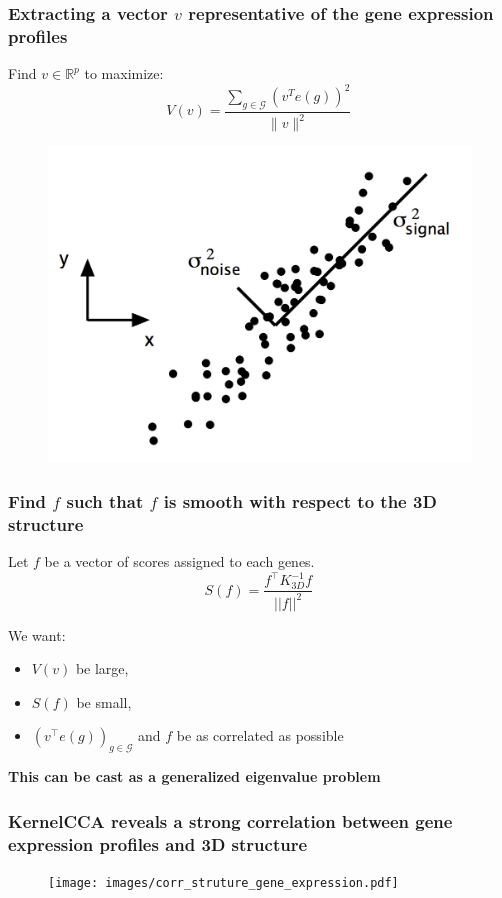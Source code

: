 \documentclass[11pt,xcolor=dvipsnames]{beamer}
\begin{document}
  \begin{frame}
  \frametitle{Extracting a vector $v$ representative of the gene expression
  profiles}
  Find $v \in \mathbb{R}^p$ to maximize:
  \begin{equation*}\label{eq:variance}
  V(v) = \frac{\sum_{g \in \mathcal{G}} \left(v^T e(g)\right)^2}{\|v\|^2}\,
  \end{equation*}

  \begin{figure}
  \includegraphics[width=0.5\linewidth]{figures/pca.png}
  \end{figure}
  \end{frame}

\begin{frame}
\frametitle{Find $f$ such that $f$ is smooth with respect to the 3D structure}
  Let $f$ be a vector of scores assigned to each genes. \\

\begin{equation*}\label{eq:smoothness}
  S(f) = \frac{f^\top K^{-1}_{3D} f}{||f||^2}\,
  \end{equation*}

  \vspace{1em}
  We want:
  \begin{itemize}[label={$\bullet$}]
  \item $V(v)$ be large,
  \item $S(f)$ be small,
  \item $\left(v^\top e(g)\right)_{g\in\mathcal{G}}$ and $f$ be as correlated as possible
  \end{itemize}

  \vspace{1em}
  \begin{center}
  {\color{Blue} \bf This can be cast as a generalized eigenvalue problem}
  \end{center}

  \end{frame}


  \begin{frame}
  \frametitle{KernelCCA reveals a strong correlation between gene expression
  profiles and 3D structure}
  \begin{figure}
  \begin{center}
  \texttt{[image: images/corr\_struture\_gene\_expression.pdf]}
  \end{center}
  \end{figure}
  \end{frame}
\end{document}
